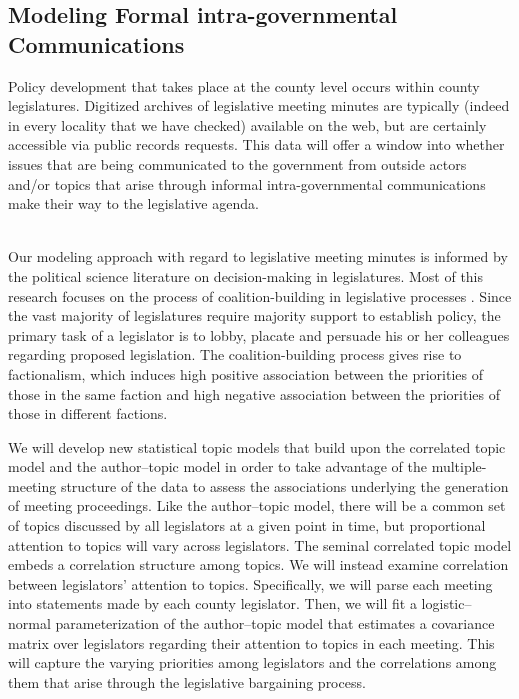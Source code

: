 \subsection{Modeling Formal intra-governmental Communications}

  Policy development that takes place at the county level occurs within county legislatures. Digitized archives of legislative meeting minutes are typically (indeed in every locality that we have checked) available on the web, but are certainly accessible via public records requests. This data will offer a window into whether issues that are being communicated to the government from outside actors and/or topics that arise through informal intra-governmental communications make their way to the legislative agenda.

~\\
 Our modeling approach with regard to legislative meeting minutes is informed by the political science literature on decision-making in legislatures. Most of this research focuses on the process of coalition-building in legislative processes \cite{Aldrich1995}. Since the vast majority of legislatures require majority support to establish policy, the primary task of a legislator is to lobby, placate and persuade his or her colleagues regarding proposed legislation. The coalition-building process gives rise to factionalism, which induces high positive association between the priorities of those in the same faction and high negative association between the priorities of those in different factions.

We will develop new statistical topic models that build upon the
correlated topic model \cite{Blei2005} and the author--topic model
\cite{Steyvers2004} in order to take advantage of the multiple-meeting
structure of the data to assess the associations underlying the
generation of meeting proceedings. Like the author--topic model, there
will be a common set of topics discussed by all legislators at a given
point in time, but proportional attention to topics will vary across
legislators. The seminal correlated topic model embeds a correlation
structure among topics. We will instead examine correlation between
legislators' attention to topics. Specifically, we will parse each
meeting into statements made by each county legislator. Then, we will
fit a logistic--normal parameterization of the author--topic model that
estimates a covariance matrix over legislators regarding their
attention to topics in each meeting. This will capture the varying
priorities among legislators and the correlations among them that
arise through the legislative bargaining process.

